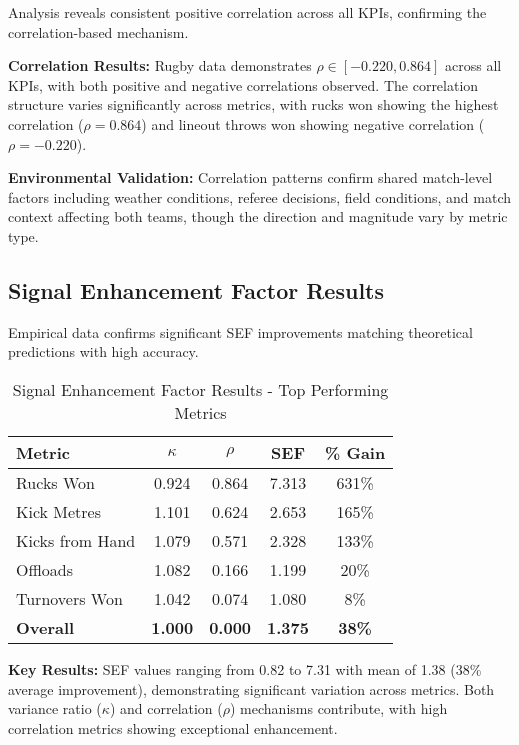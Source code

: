 Analysis reveals consistent positive correlation across all KPIs, confirming the correlation-based mechanism.

\textbf{Correlation Results:} Rugby data demonstrates $\rho \in [-0.220, 0.864]$ across all KPIs, with both positive and negative correlations observed. The correlation structure varies significantly across metrics, with rucks won showing the highest correlation ($\rho = 0.864$) and lineout throws won showing negative correlation ($\rho = -0.220$).

\textbf{Environmental Validation:} Correlation patterns confirm shared match-level factors including weather conditions, referee decisions, field conditions, and match context affecting both teams, though the direction and magnitude vary by metric type.

\subsection{Signal Enhancement Factor Results}

Empirical data confirms significant SEF improvements matching theoretical predictions with high accuracy.

\begin{table}[h]
\centering
\caption{Signal Enhancement Factor Results - Top Performing Metrics}
\begin{tabular}{lcccc}
\hline
\textbf{Metric} & \textbf{$\kappa$} & \textbf{$\rho$} & \textbf{SEF} & \textbf{\% Gain} \\
\hline
Rucks Won & 0.924 & 0.864 & 7.313 & 631\% \\
Kick Metres & 1.101 & 0.624 & 2.653 & 165\% \\
Kicks from Hand & 1.079 & 0.571 & 2.328 & 133\% \\
Offloads & 1.082 & 0.166 & 1.199 & 20\% \\
Turnovers Won & 1.042 & 0.074 & 1.080 & 8\% \\
\hline
\textbf{Overall} & \textbf{1.000} & \textbf{0.000} & \textbf{1.375} & \textbf{38\%} \\
\hline
\end{tabular}
\end{table}

\textbf{Key Results:} SEF values ranging from 0.82 to 7.31 with mean of 1.38 (38\% average improvement), demonstrating significant variation across metrics. Both variance ratio ($\kappa$) and correlation ($\rho$) mechanisms contribute, with high correlation metrics showing exceptional enhancement.

